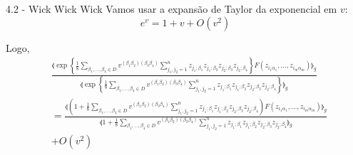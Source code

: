 \documentclass{beamer}
\begin{document}
\begin{frame}{4.2 - Wick Wick Wick}
    Vamos usar a expansão de Taylor da exponencial em $v$:
    \footnotesize
    \[
        e^v = 1 + v + O(v^2)
    \]

    \normalsize
    Logo,
    \tiny
    \begin{align*}
        &\frac{ \llangle
            \exp\left\{
                \frac{1}{8}
                \sum_{\beta_1,\dots,\beta_4 \in D}v^{(\beta_1\beta_2)(\beta_3\beta_4)}\sum_{j_1,j_2=1}^n z_{j_1;\beta_1}z_{j_1;\beta_2}z_{j_2;\beta_3}z_{j_2;\beta_4}
            \right\}F(z_{i_1\alpha_1},\dots,z_{i_m\alpha_m})
        \rrangle_g
        }{
            \llangle
            \exp \left\{
                    \frac{1}{8} \sum_{\beta_1,\dots,\beta_4 \in D}v^{(\beta_1\beta_2)(\beta_3\beta_4)}\sum_{j_1,j_2=1}^n z_{j_1;\beta_1}z_{j_1;\beta_2}z_{j_2;\beta_3}z_{j_2;\beta_4}
            \right\}
            \rrangle_g
        } \\
        &=\frac{ \llangle
            \left( 
                1 + \frac{1}{8}
                \sum_{\beta_1,\dots,\beta_4 \in D}v^{(\beta_1\beta_2)(\beta_3\beta_4)}\sum_{j_1,j_2=1}^n z_{j_1;\beta_1}z_{j_1;\beta_2}z_{j_2;\beta_3}z_{j_2;\beta_4}
            \right)F(z_{i_1\alpha_1},\dots,z_{i_m\alpha_m})
        \rrangle_g
        }{
            \llangle
                1 + \frac{1}{8} \sum_{\beta_1,\dots,\beta_4 \in D}v^{(\beta_1\beta_2)(\beta_3\beta_4)}\sum_{j_1,j_2=1}^n z_{j_1;\beta_1}z_{j_1;\beta_2}z_{j_2;\beta_3}z_{j_2;\beta_4}
            \rrangle_g
        }\\
        &+O(v^2) \\
    \end{align*}
\end{frame}
\end{document}
